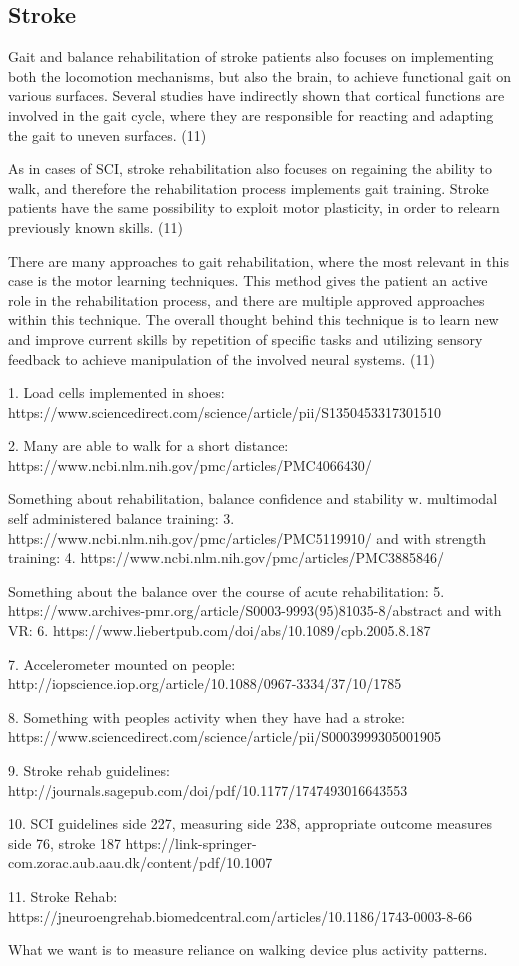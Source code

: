 \subsection{Stroke}

Gait and balance rehabilitation of stroke patients also focuses on implementing both the locomotion mechanisms, but also the brain, to achieve functional gait on various surfaces. Several studies have indirectly shown that cortical functions are involved in the gait cycle, where they are responsible for reacting and adapting the gait to uneven surfaces. (11)

As in cases of SCI, stroke rehabilitation also focuses on regaining the ability to walk, and therefore the rehabilitation process implements gait training. Stroke patients have the same possibility to exploit motor plasticity, in order to relearn previously known skills. (11)

There are many approaches to gait rehabilitation, where the most relevant in this case is the motor learning techniques. This method gives the patient an active role in the rehabilitation process, and there are multiple approved approaches within this technique. The overall thought behind this technique is to learn new and improve current skills by repetition of specific tasks and utilizing sensory feedback to achieve manipulation of the involved neural systems. (11)


1. Load cells implemented in shoes: https://www.sciencedirect.com/science/article/pii/S1350453317301510

2. Many are able to walk for a short distance: https://www.ncbi.nlm.nih.gov/pmc/articles/PMC4066430/ 

Something about rehabilitation, balance confidence and stability w. multimodal self administered balance training: 3. https://www.ncbi.nlm.nih.gov/pmc/articles/PMC5119910/ and with strength training: 4. https://www.ncbi.nlm.nih.gov/pmc/articles/PMC3885846/ 

Something about the balance over the course of acute rehabilitation: 5. https://www.archives-pmr.org/article/S0003-9993(95)81035-8/abstract and with VR: 6. https://www.liebertpub.com/doi/abs/10.1089/cpb.2005.8.187

7. Accelerometer mounted on people: http://iopscience.iop.org/article/10.1088/0967-3334/37/10/1785

8. Something with peoples activity when they have had a stroke: https://www.sciencedirect.com/science/article/pii/S0003999305001905

9. Stroke rehab guidelines: http://journals.sagepub.com/doi/pdf/10.1177/1747493016643553

10. SCI guidelines side 227, measuring side 238, appropriate outcome measures side 76, stroke 187 https://link-springer-com.zorac.aub.aau.dk/content/pdf/10.1007%

11. Stroke Rehab:
https://jneuroengrehab.biomedcentral.com/articles/10.1186/1743-0003-8-66

What we want is to measure reliance on walking device plus activity patterns.